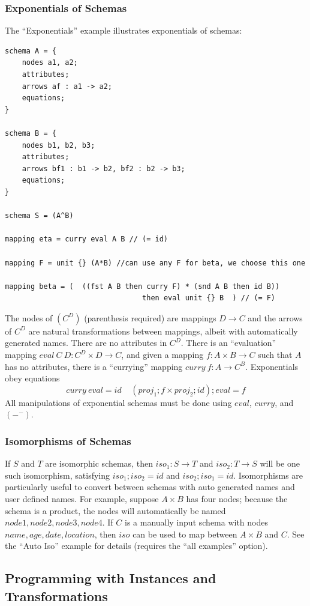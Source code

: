 \documentclass[12pt]{article}
\begin{document}
\subsubsection{Exponentials of Schemas}
The ``Exponentials'' example illustrates exponentials of schemas:
\begin{verbatim}
schema A = {
	nodes a1, a2;
	attributes;
	arrows af : a1 -> a2;
	equations;
}

schema B = {
	nodes b1, b2, b3;
	attributes;
	arrows bf1 : b1 -> b2, bf2 : b2 -> b3;
	equations;
}

schema S = (A^B)

mapping eta = curry eval A B // (= id)

mapping F = unit {} (A*B) //can use any F for beta, we choose this one

mapping beta = (  ((fst A B then curry F) * (snd A B then id B)) 
                                then eval unit {} B  ) // (= F)
\end{verbatim}
The nodes of $(C^D)$ (parenthesis required) are mappings $D \to C$ and the arrows of $C^D$ are natural transformations between mappings, albeit with automatically generated names.  There are no attributes in $C^D$.  There is an ``evaluation'' mapping $eval \ C \ D : C^D \times D \to C$, and given a mapping $f : A \times B \to C$ such that $A$ has no attributes, there is a ``currying'' mapping $curry \ f : A \to C^B$.  Exponentials obey equations
$$
curry \ eval = id \ \ \ \ \ (proj_1 ; f \times proj_2 ; id) ; eval = f
$$
All manipulations of exponential schemas must be done using $eval$, $curry$, and $(-^-)$.  

\subsubsection{Isomorphisms of Schemas}
 If $S$ and $T$ are isomorphic schemas, then $iso_1 : S \to T$ and $iso_2 : T \to S$ will be one such isomorphism, satisfying $iso_1 ; iso_2 = id$ and $iso_2 ; iso_1 = id$.  Isomorphisms are particularly useful to convert between schemas with auto generated names and user defined names.  For example, suppose $A\times B$ has four nodes; because the schema is a product, the nodes will automatically be named $node1, node2, node3, node4$.  If $C$ is a manually input schema with nodes $name, age, date, location$, then $iso$ can be used to map between $A\times B$ and $C$.  See the ``Auto Iso'' example for details (requires the ``all examples'' option). 

\subsection{Programming with Instances and Transformations}
\end{document}

